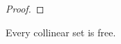 \documentclass{patmorin}
\begin{document}
\begin{proof}
%
%
\end{proof}

\begin{cor}
  Every collinear set is free.
\end{cor}
\end{document}
